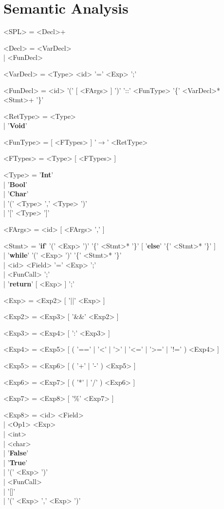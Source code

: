 \documentclass{article}
\begin{document}
\section{Semantic Analysis}
\begin{grammar}
<SPL> = <Decl>+

<Decl> = <VarDecl> \\| <FunDecl>

<VarDecl> = <Type> <id> '=' <Exp> ';'

<FunDecl> = <id> '(' [ <FArgs> ] ')' '::' <FunType> '\{' <VarDecl>* <Stmt>+ '\}'

<RetType> = <Type> \\| '\textbf{Void}'

<FunType> = [ <FTypes> ] '$\rightarrow$' <RetType>

<FTypes> = <Type> [ <FTypes> ]

<Type> = '\textbf{Int}' \\| '\textbf{Bool}' \\| '\textbf{Char}' \\| '(' <Type> ',' <Type> ')' \\| '[' <Type> ']'

<FArgs> = <id> [ <FArgs> ',' ]

<Stmt> = '\textbf{if}' '(' <Exp> ')' '\{' <Stmt>* '\}' [ '\textbf{else}' '\{' <Stmt>* '\}' ] \\| '\textbf{while}' '(' <Exp> ')' '\{' <Stmt>* '\}' \\| <id> <Field> '=' <Exp> ';' \\| <FunCall> ';' \\| '\textbf{return}' [ <Exp> ] ';'

<Exp> = <Exp2> [ '||' <Exp> ]

<Exp2> = <Exp3> [ '\&\&' <Exp2> ]

<Exp3> = <Exp4> [ ':' <Exp3> ]

<Exp4> = <Exp5> [ ( '==' | '\textless' | '\textgreater' | '\textless=' | '\textgreater=' | '!=' ) <Exp4> ]

<Exp5> = <Exp6> [ ( '+' | '-' ) <Exp5> ]

<Exp6> = <Exp7> [ ( '*' | '/' ) <Exp6> ]

<Exp7> = <Exp8> [ '\%' <Exp7> ]

<Exp8> = <id> <Field> \\| <Op1> <Exp> \\| <int> \\| <char> \\| '\textbf{False}' \\| '\textbf{True}' \\| '(' <Exp> ')' \\| <FunCall> \\| '[]' \\| '(' <Exp> ',' <Exp> ')'


\end{grammar}
\end{document}
